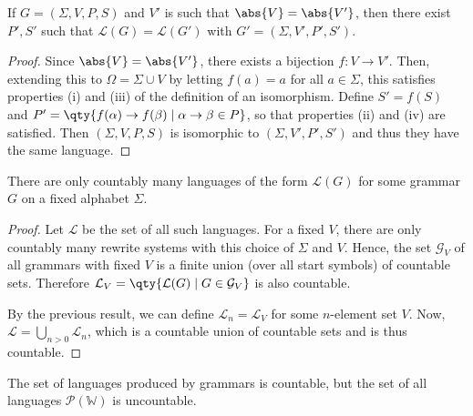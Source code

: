 \begin{proposition}
	If \( G = (\Sigma, V, P, S) \) and \( V' \) is such that \( \abs{V} = \abs{V'} \), then there exist \( P', S' \) such that \( \mathcal L(G) = \mathcal L(G') \) with \( G' = (\Sigma, V', P', S') \).
\end{proposition}
\begin{proof}
	Since \( \abs{V} = \abs{V'} \), there exists a bijection \( f \colon V \to V' \).
	Then, extending this to \( \Omega = \Sigma \cup V \) by letting \( f(a) = a \) for all \( a \in \Sigma \), this satisfies properties (i) and (iii) of the definition of an isomorphism.
	Define \( S' = f(S) \) and \( P' = \qty{f(\alpha) \to f(\beta) \mid \alpha \to \beta \in P} \), so that properties (ii) and (iv) are satisfied.
	Then \( (\Sigma, V, P, S) \) is isomorphic to \( (\Sigma, V', P', S') \) and thus they have the same language.
\end{proof}
\begin{proposition}
	There are only countably many languages of the form \( \mathcal L(G) \) for some grammar \( G \) on a fixed alphabet \( \Sigma \).
\end{proposition}
\begin{proof}
	Let \( \mathcal L \) be the set of all such languages.
	For a fixed \( V \), there are only countably many rewrite systems with this choice of \( \Sigma \) and \( V \).
	Hence, the set \( \mathcal G_V \) of all grammars with fixed \( V \) is a finite union (over all start symbols) of countable sets.
	Therefore \( \mathcal L_V = \qty{\mathcal L(G) \mid G \in \mathcal G_V} \) is also countable.

	By the previous result, we can define \( \mathcal L_n = \mathcal L_V \) for some \( n \)-element set \( V \).
	Now, \( \mathcal L = \bigcup_{n > 0} \mathcal L_n \), which is a countable union of countable sets and is thus countable.
\end{proof}
\begin{remark}
	The set of languages produced by grammars is countable, but the set of all languages \( \mathcal P(\mathbb W) \) is uncountable.
\end{remark}

